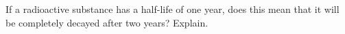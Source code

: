 If a radioactive substance has a half-life of one year,
does this mean that it will be completely decayed after
two years?  Explain.
